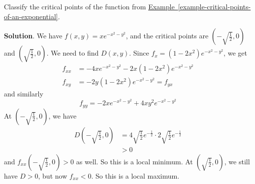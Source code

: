 \documentclass[10pt,]{book}
\theoremstyle{ptxplainnotitle}
\theoremstyle{ptxplaintitle}
\theoremstyle{ptxplainnotitle}
\theoremstyle{ptxplaintitle}
\theoremstyle{ptxplainnotitle}
\theoremstyle{ptxplaintitle}
\theoremstyle{ptxdefinitionnotitle}
\theoremstyle{ptxdefinitiontitle}
\theoremstyle{ptxdefinitionnotitle}
\theoremstyle{ptxdefinitiontitle}
\theoremstyle{ptxdefinitionnotitle}
\theoremstyle{ptxdefinitiontitle}
\theoremstyle{ptxdefinitionnotitle}
\theoremstyle{ptxdefinitiontitle}
\theoremstyle{ptxdefinitionnotitle}
\theoremstyle{ptxdefinitiontitle}
\numberwithin{equation}{section}
\begin{document}
\begin{example}\label{example-local-extrema-of-an-exponential}
\hypertarget{p-1083}{}%
Classify the critical points of the function from \hyperref[example-critical-points-of-an-exponential]{Example~\ref{example-critical-points-of-an-exponential}}.%
\par\smallskip%
\noindent\textbf{Solution}.\hypertarget{solution-170}{}\quad%
\hypertarget{p-1084}{}%
We have \(f(x,y) = xe^{-x^{2} - y^{2}}\), and the critical points are \((-\sqrt{\frac{1}{2}},0)\) and \((\sqrt{\frac{1}{2}},0)\). We need to find \(D(x,y)\). Since \(f_{x} = (1 - 2x^{2})e^{-x^{2} - y^{2}}\), we get%
\begin{align*}
f_{xx} & = -4xe^{-x^{2} - y^{2}} - 2x(1 - 2x^{2})e^{-x^{2} - y^{2}} \\
f_{xy} & = -2y(1-2x^{2})e^{-x^{2} - y^{2}} = f_{yx} 
\end{align*}
and similarly%
\begin{equation*}
f_{yy} = -2xe^{-x^{2} - y^{2}} + 4xy^{2}e^{-x^{2} - y^{2}}
\end{equation*}
At \((-\sqrt{\frac{1}{2}},0)\), we have%
\begin{align*}
D\left(-\sqrt{\frac{1}{2}},0\right) & = 4\sqrt{\frac{1}{2}}e^{-\frac{1}{2}}\cdot2\sqrt{\frac{1}{2}}e^{-\frac{1}{2}}\\
& > 0 
\end{align*}
and \(f_{xx}(-\sqrt{\frac{1}{2}},0) >0\) as well. So this is a local minimum. At \((\sqrt{\frac{1}{2}},0)\), we still have \(D>0\), but now \(f_{xx}<0\). So this is a local maximum.%
\end{example}
\typeout{************************************************}
\typeout{************************************************}
\end{document}
